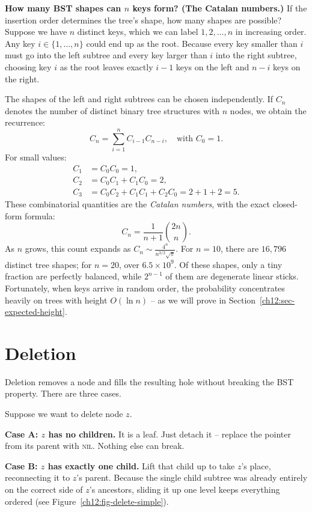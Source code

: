 \begin{intuitionbox}
\textbf{How many BST shapes can $n$ keys form? (The Catalan numbers.)}
If the insertion order determines the tree's shape, how many shapes are possible?
Suppose we have $n$ distinct keys, which we can label $1, 2, \dots, n$ in increasing order. Any key $i \in \{1, \dots, n\}$ could end up as the root. Because every key smaller than $i$ must go into the left subtree and every key larger than $i$ into the right subtree, choosing key $i$ as the root leaves exactly $i-1$ keys on the left and $n-i$ keys on the right.

The shapes of the left and right subtrees can be chosen independently. If $C_n$ denotes the number of distinct binary tree structures with $n$ nodes, we obtain the recurrence:
\[
  C_n = \sum_{i=1}^n C_{i-1} C_{n-i}, \quad \text{with } C_0 = 1.
\]
For small values:
\begin{align*}
  C_1 &= C_0 C_0 = 1, \\
  C_2 &= C_0 C_1 + C_1 C_0 = 2, \\
  C_3 &= C_0 C_2 + C_1 C_1 + C_2 C_0 = 2 + 1 + 2 = 5.
\end{align*}
These combinatorial quantities are the \emph{Catalan numbers}, with the exact closed-form formula:
\[
  C_n = \frac{1}{n+1}\binom{2n}{n}.
\]
As $n$ grows, this count expands as $C_n \sim \frac{4^n}{n^{3/2}\sqrt{\pi}}$. For $n = 10$, there are $16{,}796$ distinct tree shapes; for $n = 20$, over $6.5 \times 10^9$. Of these shapes, only a tiny fraction are perfectly balanced, while $2^{n-1}$ of them are degenerate linear sticks. Fortunately, when keys arrive in random order, the probability concentrates heavily on trees with height $O(\ln n)$ -- as we will prove in Section~\ref{ch12:sec-expected-height}.
\end{intuitionbox}

\section{Deletion}

Deletion removes a node and fills the resulting hole without breaking the BST property.
There are three cases.

Suppose we want to delete node $z$.

\textbf{Case A: $z$ has no children.} It is a leaf. Just detach it -- replace the pointer
from its parent with \textsc{nil}. Nothing else can break.

\textbf{Case B: $z$ has exactly one child.} Lift that child up to take $z$'s place,
reconnecting it to $z$'s parent. Because the single child subtree was already entirely on the
correct side of $z$'s ancestors, sliding it up one level keeps everything ordered (see Figure~\ref{ch12:fig-delete-simple}).

